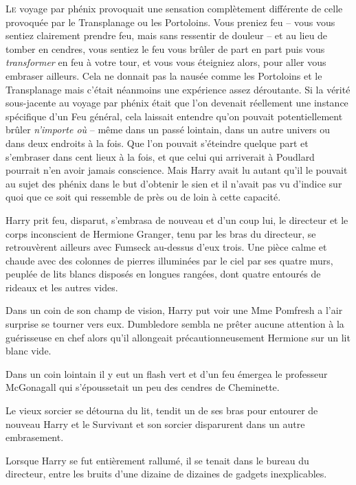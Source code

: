 
\lettrine{L}{e} voyage par phénix provoquait une sensation complètement différente de celle provoquée par le Transplanage ou les Portoloins.
Vous preniez feu -- vous vous sentiez clairement prendre feu, mais sans ressentir de douleur -- et au lieu de tomber en cendres, vous sentiez le feu vous brûler de part en part puis vous \emph{transformer} en feu à votre tour, et vous vous éteigniez alors, pour aller vous embraser ailleurs.
Cela ne donnait pas la nausée comme les Portoloins et le Transplanage mais c'était néanmoins une expérience assez déroutante.
Si la vérité sous-jacente au voyage par phénix était que l'on devenait réellement une instance spécifique d'un Feu général, cela laissait entendre qu'on pouvait potentiellement brûler \emph{n'importe où} -- même dans un passé lointain, dans un autre univers ou dans deux endroits à la fois.
Que l'on pouvait s'éteindre quelque part et s'embraser dans cent lieux à la fois, et que celui qui arriverait à Poudlard pourrait n'en avoir jamais conscience.
Mais Harry avait lu autant qu'il le pouvait au sujet des phénix dans le but d'obtenir le sien et il n'avait pas vu d'indice sur quoi que ce soit qui ressemble de près ou de loin à cette capacité.

Harry prit feu, disparut, s'embrasa de nouveau et d'un coup lui, le directeur et le corps inconscient de Hermione Granger, tenu par les bras du directeur, se retrouvèrent ailleurs avec Fumseck au-dessus d'eux trois.
Une pièce calme et chaude avec des colonnes de pierres illuminées par le ciel par ses quatre murs, peuplée de lits blancs disposés en longues rangées, dont quatre entourés de rideaux et les autres vides.

Dans un coin de son champ de vision, Harry put voir une Mme Pomfresh a l'air surprise se tourner vers eux.
Dumbledore sembla ne prêter aucune attention à la guérisseuse en chef alors qu'il allongeait précautionneusement Hermione sur un lit blanc vide.

Dans un coin lointain il y eut un flash vert et d'un feu émergea le professeur McGonagall qui s'époussetait un peu des cendres de Cheminette.

Le vieux sorcier se détourna du lit, tendit un de ses bras pour entourer de nouveau Harry et le Survivant et son sorcier disparurent dans un autre embrasement.

\later

Lorsque Harry se fut entièrement rallumé, il se tenait dans le bureau du directeur, entre les bruits d'une dizaine de dizaines de gadgets inexplicables.

